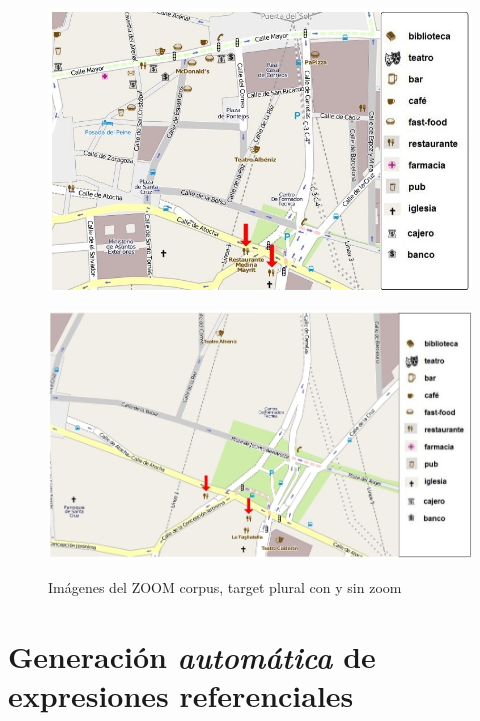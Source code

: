 \begin{figure}[!ht]
\begin{minipage}[b]{0.47\linewidth}
\centering
\includegraphics[width=\textwidth]{images/corpus/mapa10.png}\\[0pt]
\caption{}
\label{pluralx}
\end{minipage}
\begin{minipage}[b]{0.53\linewidth}
\centering
\includegraphics[width=\textwidth]{images/corpus/mapa20.png}\\[0pt]
\caption{}
\label{plural2x}
\end{minipage}
\caption{Im\'agenes del ZOOM corpus, target plural con y sin zoom}
\end{figure}


\section{Generaci\'on \emph{autom\'atica} de expresiones referenciales}
\label{sec:tipos_algoritmos}

